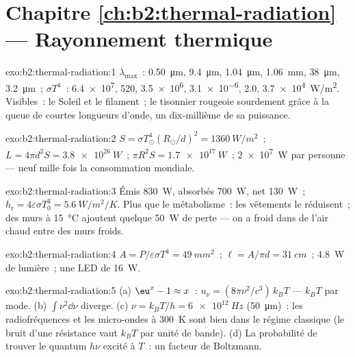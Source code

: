 \section*{Chapitre \ref{ch:b2:thermal-radiation} --- Rayonnement thermique}

\begin{solution}{exo:b2:thermal-radiation:1}
$\lambda_{\max}$~: \qty{0.50}{\micro m}, \qty{9.4}{\micro m}, \qty{1.04}{\micro m},
\qty{1.06}{mm}, \qty{38}{\micro m}, \qty{3.2}{\micro m}~; $\sigma T^4$~: \qty{6.4e7}{},
\qty{520}{}, \qty{3.5e6}{}, \qty{3.1e-6}{}, \qty{2.0}{}, \qty{3.7e4}{W/m^2}. Visibles~:
le Soleil et le filament~; le tisonnier rougeoie sourdement grâce à la
queue de courtes longueurs d'onde, un dix-millième de sa puissance.
\end{solution}

\begin{solution}{exo:b2:thermal-radiation:2}
$S = \sigma T_\odot^4(R_\odot/d)^2 = \qty{1360}{W/m^2}$~; $L = 4\pi d^2S =
\qty{3.8e26}{W}$~; $\pi R^2S = \qty{1.7e17}{W}$~; \qty{2e7}{W} par personne --- neuf
mille fois la consommation mondiale.
\end{solution}

\begin{solution}{exo:b2:thermal-radiation:3}
Émis \qty{830}{W}, absorbés \qty{700}{W}, net \qty{130}{W}~; $h_{\text{r}} =
4\varepsilon\sigma T_0^3 = \qty{5.6}{W/m^2/K}$. Plus que le métabolisme~:
les vêtements le réduisent~; des murs à \qty{15}{\celsius} ajoutent quelque \qty{50}{W} de perte
--- on a froid dans de l'air chaud entre des murs froids.
\end{solution}

\begin{solution}{exo:b2:thermal-radiation:4}
$A = P/\varepsilon\sigma T^4 = \qty{49}{mm^2}$~; $\ell = A/\pi d = \qty{31}{cm}$~;
\qty{4.8}{W} de lumière~; une LED de \qty{16}{W}.
\end{solution}

\begin{solution}{exo:b2:thermal-radiation:5}
(a) $\eu^x - 1 \approx x$~: $u_\nu = (8\pi\nu^2/c^3)\,k_BT$ --- $k_BT$ par mode.
(b) $\int\nu^2\dd\nu$ diverge. (c) $\nu = k_BT/h = \qty{6e12}{Hz}$ (\qty{50}{\micro m})~:
les radiofréquences et les micro-ondes à \qty{300}{K} sont bien dans le régime classique (le
bruit d'une résistance vaut $k_BT$ par unité de bande). (d) La probabilité de
trouver le quantum $h\nu$ excité à $T$~: un facteur de Boltzmann.
\end{solution}

